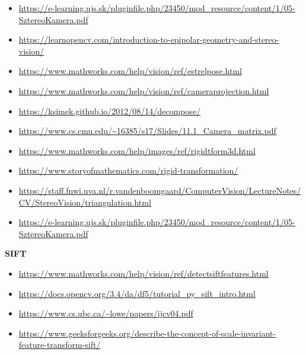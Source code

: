 \documentclass[12pt]{report}
\begin{document}
\begin{itemize}
            \item \url{https://e-learning.ujs.sk/pluginfile.php/23450/mod_resource/content/1/05-SztereoKamera.pdf}
            \item \url{https://learnopencv.com/introduction-to-epipolar-geometry-and-stereo-vision/}
            \item \url{https://www.mathworks.com/help/vision/ref/estrelpose.html}
            \item \url{https://www.mathworks.com/help/vision/ref/cameraprojection.html}
            \item \url{https://ksimek.github.io/2012/08/14/decompose/}
            \item \url{https://www.cs.cmu.edu/~16385/s17/Slides/11.1_Camera_matrix.pdf}
            \item \url{https://www.mathworks.com/help/images/ref/rigidtform3d.html}
            \item \url{https://www.storyofmathematics.com/rigid-transformation/}
            \item \url{https://staff.fnwi.uva.nl/r.vandenboomgaard/ComputerVision/LectureNotes/CV/StereoVision/triangulation.html}
            \item \url{https://e-learning.ujs.sk/pluginfile.php/23450/mod_resource/content/1/05-SztereoKamera.pdf}
        \end{itemize}
        \textbf{SIFT}
        \begin{itemize}
            \item \url{https://www.mathworks.com/help/vision/ref/detectsiftfeatures.html}
            \item \url{https://docs.opencv.org/3.4/da/df5/tutorial_py_sift_intro.html}
            \item \url{https://www.cs.ubc.ca/~lowe/papers/ijcv04.pdf}
            \item \url{https://www.geeksforgeeks.org/describe-the-concept-of-scale-invariant-feature-transform-sift/}
        \end{itemize}
\end{document}
